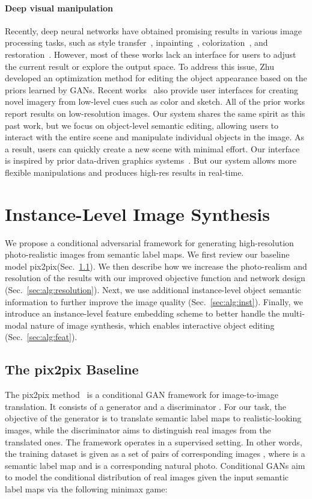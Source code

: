 \documentclass[10pt,twocolumn,letterpaper]{article}
\newcommand{\refsec}[1]{Sec.~\ref{sec:#1}}
\newcommand{\lblsec}[1]{\label{sec:#1}}
\newcommand{\pp}{pix2pix\xspace}
\begin{document}
\paragraph{Deep visual manipulation}
Recently, deep neural networks have obtained promising results in various image processing tasks, such as style transfer~\cite{gatys2016image}, inpainting~\cite{pathak2016context}, colorization~\cite{zhang2016colorful}, and restoration~\cite{gharbi2016deep}. However, most of these works lack an interface for users to adjust the current result or explore the output space. 
To address this issue, Zhu~\etal~\cite{zhu2016generative} developed an optimization method for editing the object appearance based on the priors learned by GANs. Recent works~\cite{isola2016image,sangkloy2016scribbler,zhang2017real} also provide user interfaces for creating novel imagery from low-level cues such as color and sketch. All of the prior works report results on low-resolution images. Our system shares the same spirit as this past work, but we focus on object-level semantic editing, allowing users to interact with the entire scene and manipulate individual objects in the image. As a result, users can quickly create a new scene with minimal effort. Our interface is inspired by prior data-driven graphics systems~\cite{johnson2006semantic,lalonde2007photo,chen2009sketch2photo}. But our system allows more flexible manipulations and produces high-res results in real-time.  \section{Instance-Level Image Synthesis}
\lblsec{alg}
We propose a conditional adversarial framework for generating high-resolution photo-realistic images from semantic label maps. We first review our baseline model \pp (\refsec{alg:pix2pix}). We then describe how we increase the photo-realism and resolution of the results with our improved objective function and network design (\refsec{alg:resolution}). Next, we use additional instance-level object semantic information to further improve the image quality (\refsec{alg:inst}). Finally, we introduce an instance-level feature embedding scheme to better handle the multi-modal nature of image synthesis, which enables interactive object editing (\refsec{alg:feat}).

\subsection{The pix2pix Baseline} \lblsec{alg:pix2pix}
The \pp method~\cite{isola2016image} is a conditional GAN framework for image-to-image translation. It consists of a generator  and a discriminator . For our task, the objective of the generator  is to translate semantic label maps to realistic-looking images, while the discriminator  aims to distinguish real images from the translated ones. The framework operates in a supervised setting. In other words, the training dataset is given as a set of pairs of corresponding images , where  is a semantic label map and  is a corresponding natural photo. Conditional GANs aim to model the conditional distribution of real images given the input semantic label maps via the following minimax game: 
\end{document}
